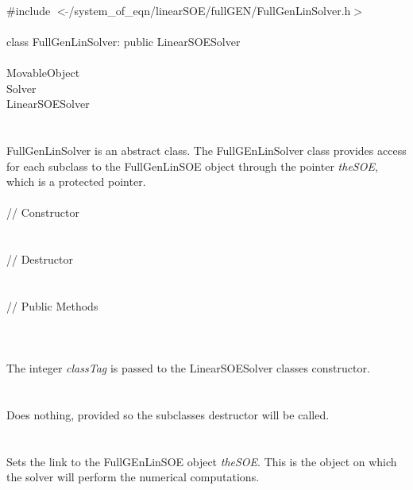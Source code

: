 
   \\
\indent \#include $<\tilde{ }$/system\_of\_eqn/linearSOE/fullGEN/FullGenLinSolver.h$>$  \\

  \\
\indent class FullGenLinSolver: public LinearSOESolver  \\

 \\
\indent MovableObject \\
\indent\indent  Solver \\
\indent\indent\indent LinearSOESolver \\
\indent\indent\indent{} \\

  \\
\indent FullGenLinSolver is an abstract class.  The FullGEnLinSolver
class provides access for each subclass to the FullGenLinSOE object
through the pointer {\em theSOE}, which is a protected pointer. \\

  \\
\indent\indent // Constructor \\
\indent{}  \\ \\
\indent\indent // Destructor \\
\indent{}\\  \\
\indent\indent // Public Methods \\
\indent{} \\

  \\
  \\
The integer {\em classTag} is passed to the LinearSOESolver classes
constructor. \\ 

 \\
\\ 
Does nothing, provided so the subclasses destructor will be called. \\

  \\
 \\
Sets the link to the FullGEnLinSOE object {\em theSOE}. This is the
object on which the solver will perform the numerical computations. \\





